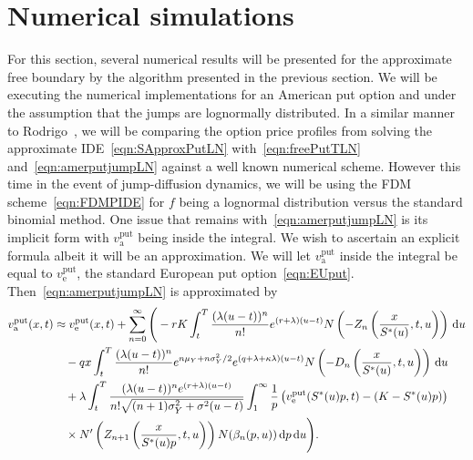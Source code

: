 \section{Numerical simulations}
For this section, several numerical results will be presented for the approximate free boundary by the algorithm presented in the previous section. We will be executing the numerical implementations for an American put option and under the assumption that the jumps are lognormally distributed. In a similar manner to Rodrigo~\cite{Rodrigo2013}, we will be comparing the option price profiles from solving the approximate IDE~\eqref{eqn:SApproxPutLN} with~\eqref{eqn:freePutTLN} and~\eqref{eqn:amerputjumpLN} against a well known numerical scheme. However this time in the event of jump-diffusion dynamics, we will be using the FDM scheme~\eqref{eqn:FDMPIDE} for $f$ being a lognormal distribution versus the standard binomial method. One issue that remains with~\eqref{eqn:amerputjumpLN} is its implicit form with $v_{\text{a}}^{\text{put}}$ being inside the integral. We wish to ascertain an explicit formula albeit it will be an approximation. We will let $v_{\text{a}}^{\text{put}}$ inside the integral be equal to $v_\text{e}^{\text{put}}$, the standard European put option~\eqref{eqn:EUput}. Then~\eqref{eqn:amerputjumpLN} is approximated by
	\begin{equation}
			\label{eqn:amerputjumpLNApprox}
			\begin{split}
				 v_{\text{a}}^{\text{put}}(x,t) &\approx   v_{\text{e}}^{\text{put}}(x,t) + \displaystyle\sum\limits_{n=0}^\infty \Bigg( -rK\int_t^T  \frac{(\lambda(u-t))^n}{n!} e^{(r+\lambda)(u-t)} N\left(-Z_n \left( \frac{x}{S^*(u)},t,u  \right) \right) \, \mathrm d u \\
				 &\quad{} -qx \int_t^T   \frac{(\lambda(u-t))^n}{n!} e^{n\mu_Y + n\sigma_Y^2/2} e^{(q+\lambda + \kappa\lambda)(u-t)} N\left( -D_n \left( \frac{x}{S^*(u)},t,u  \right) \right) \, \mathrm d u \\
				&\quad{} +  \lambda \int_t^T  \frac{(\lambda(u-t))^ne^{(r+\lambda)(u-t)}}{n!\sqrt{(n+1)\sigma_Y^2 + \sigma^2(u-t)}}\int_1^\infty \frac{1}{p}\left( v_\text{e}^{\text{put}}(S^*(u)p,t) - (K-S^*(u)p) \right) \\
			&\quad {} \times N'\left( Z_{n+1}\left( \frac{x}{S^*(u)p}, t, u \right)\right)N(\beta_n(p,u))  \, \mathrm d p \, \mathrm d u  \Bigg).
			\end{split}
		\end{equation}

